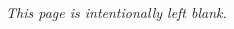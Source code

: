 \documentclass[11pt,fleqn]{book} %
\def\R{\mathbb{R}}
\begin{document}
\begin{CJK}{UTF8}{gkai}

\pagestyle{fancy} %

\newpage
\thispagestyle{empty}
\centering 
\vspace*{10cm}
\textit{This page is intentionally left blank.}




\end{CJK}
\end{document}
